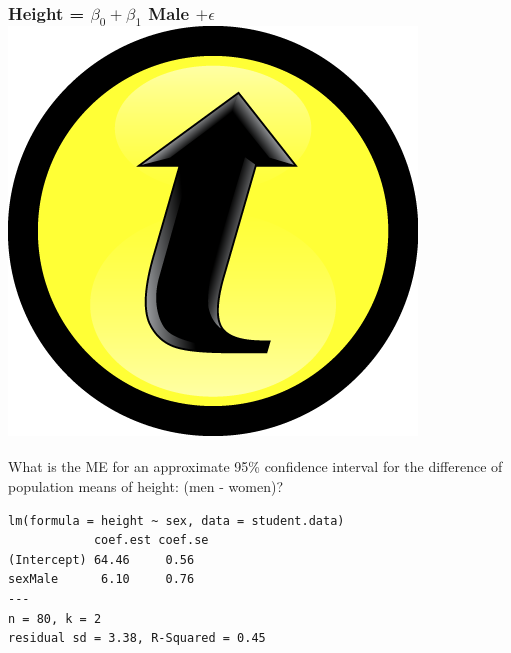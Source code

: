 \documentclass[handout]{beamer}
\begin{document}
\begin{frame}[fragile]
\frametitle{Height = $\beta_0 + \beta_1$ Male $+ \epsilon$ \hfill \includegraphics[scale = 0.05]{./images/clicker}}

\alert{What is the ME for an approximate 95\% confidence interval for the difference of population means of height: (men - women)?}

\footnotesize
\begin{verbatim}
lm(formula = height ~ sex, data = student.data)
            coef.est coef.se
(Intercept) 64.46     0.56  
sexMale      6.10     0.76  
---
n = 80, k = 2
residual sd = 3.38, R-Squared = 0.45
\end{verbatim}

\end{frame}


\end{document}

